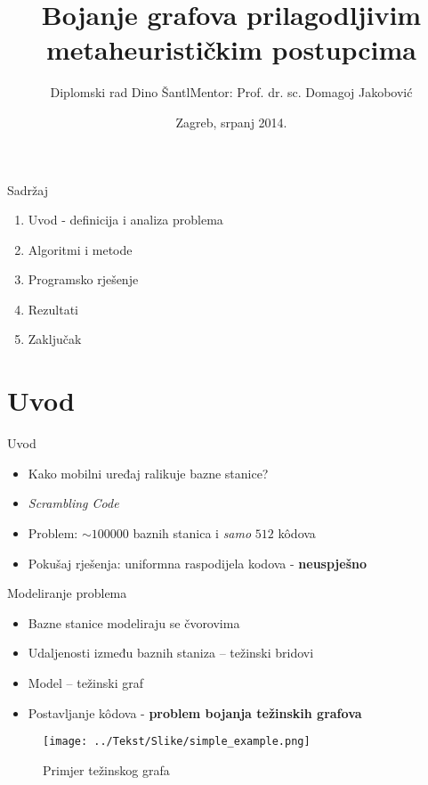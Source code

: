 \documentclass[utf8]{beamer}
\title[Bojanje grafova prilagodljivim metaheurističkim postupcima]{Bojanje grafova prilagodljivim metaheurističkim postupcima}
\author[Dino Šantl]{Diplomski rad \newline\newline Dino Šantl\newline Mentor: Prof. dr. sc. Domagoj Jakobović}
\institute{Fakultet elektrotehnike i računarstva}
\date{Zagreb, srpanj 2014.}
\begin{document}
\begin{frame}
\titlepage
\end{frame}

\section*{}
\begin{frame}{Sadržaj}
	\begin{enumerate}
		\item Uvod - definicija i analiza problema
		\item Algoritmi i metode
		\item Programsko rješenje
		\item Rezultati
		\item Zaključak
	\end{enumerate}
\end{frame}


\section{Uvod}
\begin{frame}{Uvod}
	\begin{itemize}
		\item Kako mobilni uređaj ralikuje bazne stanice?
		\pause
		\item \emph{Scrambling Code}
		\pause
		\item Problem: $\sim 100000$ baznih stanica i \emph{samo} $512$ k\^{o}dova
		\pause
		\item Pokušaj rješenja: uniformna raspodijela kodova - \textbf{neuspješno} 
	\end{itemize}
\end{frame}

\begin{frame}{Modeliranje problema}
	\begin{itemize}
		\item Bazne stanice modeliraju se čvorovima
		\item Udaljenosti između baznih staniza -- težinski bridovi
		\item Model -- težinski graf
		\item Postavljanje k\^{o}dova - \textbf{problem bojanja težinskih grafova}
	\end{itemize}
	\begin{figure}[h]
  \caption{Primjer težinskog grafa}
  \centering
    \texttt{[image: ../Tekst/Slike/simple\_example.png]}
	\end{figure}
\end{frame}
\end{document}
